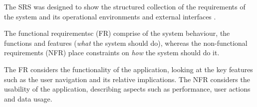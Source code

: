 

The SRS was designed to show the structured collection of the requirements of the system and its operational environments and external interfaces \cite{IEEE24765}. 

The functional requirementsc (FR) comprise of the system behaviour, the functions and features (\textit{what} the system should do), whereas the non-functional requirements (NFR) place constraints on \textit{how} the system should do it.

The FR considers the functionality of the application, looking at the key features such as the user navigation and its relative implications. The NFR considers the usability of the application, describing aspects such as performance, user actions and data usage.

